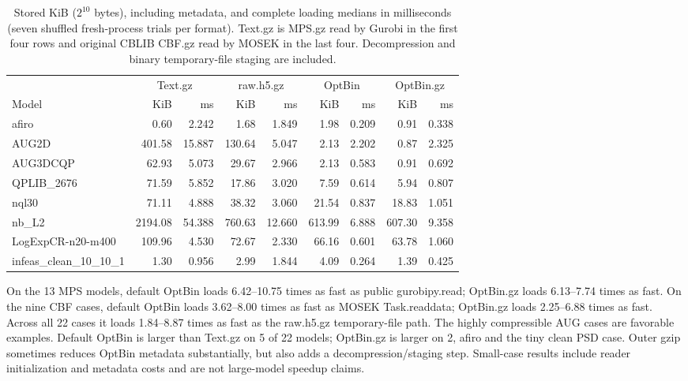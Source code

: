 \documentclass[10pt]{article}
\begin{document}
\begin{table}[ht]\centering\small\setlength{\tabcolsep}{3pt}
\begin{tabular}{lrrrrrrrr}\toprule
 & \multicolumn{2}{c}{Text.gz} & \multicolumn{2}{c}{raw.h5.gz} & \multicolumn{2}{c}{OptBin} & \multicolumn{2}{c}{OptBin.gz} \\
Model & KiB & ms & KiB & ms & KiB & ms & KiB & ms \\ \midrule
afiro & 0.60 & 2.242 & 1.68 & 1.849 & 1.98 & 0.209 & 0.91 & 0.338 \\
AUG2D & 401.58 & 15.887 & 130.64 & 5.047 & 2.13 & 2.202 & 0.87 & 2.325 \\
AUG3DCQP & 62.93 & 5.073 & 29.67 & 2.966 & 2.13 & 0.583 & 0.91 & 0.692 \\
QPLIB\_2676 & 71.59 & 5.852 & 17.86 & 3.020 & 7.59 & 0.614 & 5.94 & 0.807 \\
nql30 & 71.11 & 4.888 & 38.32 & 3.060 & 21.54 & 0.837 & 18.83 & 1.051 \\
nb\_L2 & 2194.08 & 54.388 & 760.63 & 12.660 & 613.99 & 6.888 & 607.30 & 9.358 \\
LogExpCR-n20-m400 & 109.96 & 4.530 & 72.67 & 2.330 & 66.16 & 0.601 & 63.78 & 1.060 \\
infeas\_clean\_10\_10\_1 & 1.30 & 0.956 & 2.99 & 1.844 & 4.09 & 0.264 & 1.39 & 0.425 \\
\bottomrule\end{tabular}
\caption{Stored KiB ($2^{10}$ bytes), including metadata, and complete loading medians in milliseconds (seven shuffled fresh-process trials per format). Text.gz is MPS.gz read by Gurobi in the first four rows and original CBLIB CBF.gz read by MOSEK in the last four. Decompression and binary temporary-file staging are included.}\end{table}

On the 13 MPS models, default OptBin loads 6.42--10.75 times as fast as public gurobipy.read; OptBin.gz loads 6.13--7.74 times as fast. On the nine CBF cases, default OptBin loads 3.62--8.00 times as fast as MOSEK Task.readdata; OptBin.gz loads 2.25--6.88 times as fast. Across all 22 cases it loads 1.84--8.87 times as fast as the raw.h5.gz temporary-file path. The highly compressible AUG cases are favorable examples. Default OptBin is larger than Text.gz on 5 of 22 models; OptBin.gz is larger on 2, afiro and the tiny clean PSD case. Outer gzip sometimes reduces OptBin metadata substantially, but also adds a decompression/staging step. Small-case results include reader initialization and metadata costs and are not large-model speedup claims.
\end{document}
